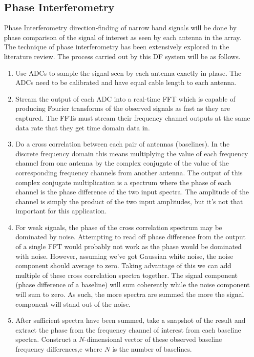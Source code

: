 \subsection{Phase Interferometry}
Phase Interferometry direction-finding of narrow band signals will be done by phase comparison of the signal of interest as seen by each antenna in the array. The technique of phase interferometry has been extensively explored in the literature review. The process carried out by this DF system will be as follows.
\begin{enumerate}
  \item Use ADCs to sample the signal seen by each antenna exactly in phase. The ADCs need to be calibrated and have equal cable length to each antenna.
  \item Stream the output of each ADC into a real-time FFT which is capable of producing Fourier transforms of the observed signals as fast as they are captured. The FFTs must stream their frequency channel outputs at the same data rate that they get time domain data in.
  \item Do a cross correlation between each pair of antennas (baselines). In the discrete frequency domain this means multiplying the value of each frequency channel from one antenna by the complex conjugate of the value of the corresponding frequency channels from another antenna. The output of this complex conjugate multiplication is a spectrum where the phase of each channel is the phase difference of the two input spectra. The amplitude of the channel is simply the product of the two input amplitudes, but it's not that important for this application.
  \item For weak signals, the phase of the cross correlation spectrum may be dominated by noise. Attempting to read off phase difference from the output of a single FFT would probably not work as the phase would be dominated with noise. However, assuming we've got Gaussian white noise, the noise component should average to zero. Taking advantage of this we can add multiple of these cross correlation spectra together. The signal component (phase difference of a baseline) will sum coherently while the noise component will sum to zero. As such, the more spectra are summed the more the signal component will stand out of the noise.
  \item After sufficient spectra have been summed, take a snapshot of the result and extract the phase from the frequency channel of interest from each baseline spectra. Construct a \(N\)-dimensional vector of these observed baseline frequency differences,e where \(N\) is the number of baselines.

\end{enumerate}
